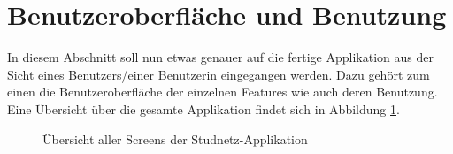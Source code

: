 \documentclass[../main.tex]{subfiles}
\begin{document}
\section{Benutzeroberfläche und Benutzung}%
In diesem Abschnitt soll nun etwas genauer auf die fertige Applikation aus der Sicht eines Benutzers/einer Benutzerin eingegangen werden. Dazu gehört zum einen die Benutzeroberfläche der einzelnen Features wie auch deren Benutzung. Eine Übersicht über die gesamte Applikation findet sich in Abbildung \ref{overview}.
\begin{figure} 
	\centering
	\caption{Übersicht aller Screens der Studnetz-Applikation}
	\label{overview}
\end{figure}
\end{document}
